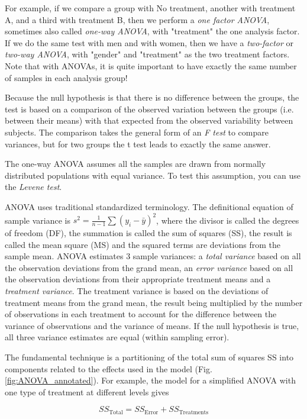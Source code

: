 For example, if we compare a group with No treatment, another with treatment A, and a third with treatment B, then we perform a \emph{one factor ANOVA}, sometimes also called \emph{one-way ANOVA}, with "treatment" the one analysis factor. If we do the same test with men and with women, then we have a \emph{two-factor} or \emph{two-way ANOVA}, with "gender" and "treatment" as the two treatment factors. Note that with ANOVAs, it is quite important to have exactly the same number of samples in each analysis group!

Because the null hypothesis is that there is no difference between the groups, the test is based on a comparison of the observed variation between the groups (i.e. between their means) with that expected from the observed variability between subjects. The comparison takes the general form of an \emph{F test} to compare variances, but for two groups the t test leads to exactly the same answer.

The one-way ANOVA assumes all the samples are drawn from normally distributed populations with equal variance. To test this assumption, you can use the \emph{Levene test}.

ANOVA uses traditional standardized terminology. The definitional equation of sample variance is $s^2=\textstyle\frac{1}{n-1}\sum(y_i-\bar{y})^2$,
where the divisor is called the degrees of freedom (DF), the summation is called the sum of squares (SS), the result is called the mean square (MS) and the squared terms are deviations from the sample mean. ANOVA estimates 3 sample variances: a \emph{total variance }based on all the observation deviations from the grand mean, an \emph{error variance }based on all the observation deviations from their appropriate treatment means and a \emph{treatment variance}. The treatment variance is based on the deviations of treatment means from the grand mean, the result being multiplied by the number of observations in each treatment to account for the difference between the variance of observations and the variance of means. If the null hypothesis is true, all three variance estimates are equal (within sampling error).

The fundamental technique is a partitioning of the total sum of squares SS into components related to the effects used in the model (Fig. \ref{fig:ANOVA_annotated}). For example, the model for a simplified ANOVA with one type of treatment at different levels gives

\begin{equation}
  SS_\text{Total} = SS_\text{Error} + SS_\text{Treatments}
\end{equation}


